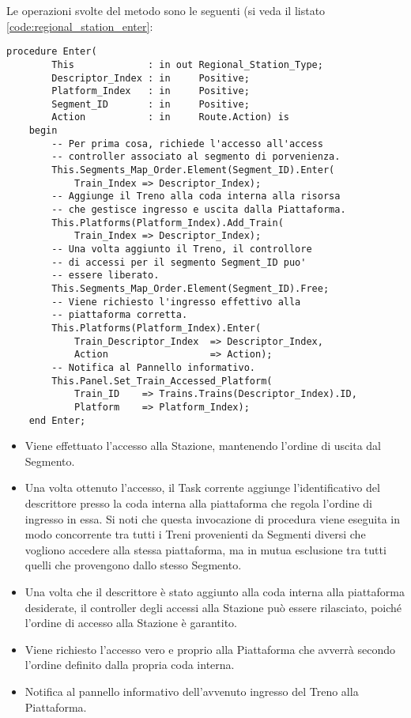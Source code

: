 	Le operazioni svolte del metodo  sono le seguenti (si veda il listato \ref{code:regional_station_enter}:
	
\begin{lstlisting}[caption=\small{Metodo \ttt{Enter} fornito dal tipo \ttt{Regional\_Station\_Type}},label=code:regional_station_enter]
	procedure Enter(
		This             : in out Regional_Station_Type;
		Descriptor_Index : in     Positive;
		Platform_Index   : in     Positive;
		Segment_ID       : in 	  Positive;
		Action           : in 	  Route.Action) is
	begin
		-- Per prima cosa, richiede l'accesso all'access
		-- controller associato al segmento di porvenienza.
		This.Segments_Map_Order.Element(Segment_ID).Enter(
			Train_Index	=> Descriptor_Index);
		-- Aggiunge il Treno alla coda interna alla risorsa 
		-- che gestisce ingresso e uscita dalla Piattaforma.
		This.Platforms(Platform_Index).Add_Train(
			Train_Index	=> Descriptor_Index);
		-- Una volta aggiunto il Treno, il controllore
		-- di accessi per il segmento Segment_ID puo'
		-- essere liberato.
		This.Segments_Map_Order.Element(Segment_ID).Free;
		-- Viene richiesto l'ingresso effettivo alla 
		-- piattaforma corretta.
		This.Platforms(Platform_Index).Enter(
			Train_Descriptor_Index 	=> Descriptor_Index,
			Action					=> Action);
		-- Notifica al Pannello informativo.
		This.Panel.Set_Train_Accessed_Platform(
			Train_ID	=> Trains.Trains(Descriptor_Index).ID,
			Platform 	=> Platform_Index);
	end Enter;
\end{lstlisting}
	
	\begin{itemize}
	
		\item Viene effettuato l'accesso alla Stazione, mantenendo l'ordine di uscita dal Segmento.

		\item Una volta ottenuto l'accesso, il Task corrente aggiunge l'identificativo del descrittore presso la coda interna alla piattaforma che regola l'ordine di ingresso in essa.
		Si noti che questa invocazione di procedura viene eseguita in modo concorrente tra tutti i Treni provenienti da Segmenti diversi che vogliono accedere alla stessa piattaforma, ma in mutua esclusione tra tutti quelli che provengono dallo stesso Segmento.

		\item Una volta che il descrittore è stato aggiunto alla coda interna alla piattaforma desiderate, il controller degli accessi alla Stazione può essere rilasciato, poiché l'ordine di accesso alla Stazione è garantito.

		\item Viene richiesto l'accesso vero e proprio alla Piattaforma che avverrà secondo l'ordine definito dalla propria coda interna.

		\item Notifica al pannello informativo dell'avvenuto ingresso del Treno alla Piattaforma.

	\end{itemize}
	
